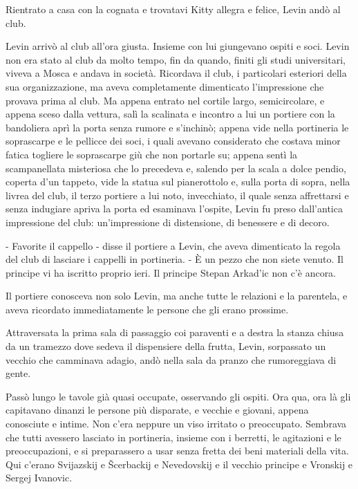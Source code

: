 Rientrato a casa con la cognata e trovatavi Kitty allegra e felice, Levin andò al club. 

\label{vii-6} 

Levin arrivò al club all'ora giusta. Insieme con lui giungevano ospiti e soci. Levin non era stato al club da molto tempo, fin da quando, finiti gli studi universitari, viveva a Mosca e andava in società. Ricordava il club, i particolari esteriori della sua organizzazione, ma aveva completamente dimenticato l'impressione che provava prima al club. Ma appena entrato nel cortile largo, semicircolare, e appena sceso dalla vettura, salì la scalinata e incontro a lui un portiere con la bandoliera aprì la porta senza rumore e s'inchinò; appena vide nella portineria le soprascarpe e le pellicce dei soci, i quali avevano considerato che costava minor fatica togliere le soprascarpe giù che non portarle su; appena sentì la scampanellata misteriosa che lo precedeva e, salendo per la scala a dolce pendio, coperta d'un tappeto, vide la statua sul pianerottolo e, sulla porta di sopra, nella livrea del club, il terzo portiere a lui noto, invecchiato, il quale senza affrettarsi e senza indugiare apriva la porta ed esaminava l'ospite, Levin fu preso dall'antica impressione del club: un'impressione di distensione, di benessere e di decoro. 

- Favorite il cappello - disse il portiere a Levin, che aveva dimenticato la regola del club di lasciare i cappelli in portineria. - È un pezzo che non siete venuto. Il principe vi ha iscritto proprio ieri. Il principe Stepan Arkad'ic non c'è ancora. 

Il portiere conosceva non solo Levin, ma anche tutte le relazioni e la parentela, e aveva ricordato immediatamente le persone che gli erano prossime. 

Attraversata la prima sala di passaggio coi paraventi e a destra la stanza chiusa da un tramezzo dove sedeva il dispensiere della frutta, Levin, sorpassato un vecchio che camminava adagio, andò nella sala da pranzo che rumoreggiava di gente. 

Passò lungo le tavole già quasi occupate, osservando gli ospiti. Ora qua, ora là gli capitavano dinanzi le persone più disparate, e vecchie e giovani, appena conosciute e intime. Non c'era neppure un viso irritato o preoccupato. Sembrava che tutti avessero lasciato in portineria, insieme con i berretti, le agitazioni e le preoccupazioni, e si preparassero a usar senza fretta dei beni materiali della vita. Qui c'erano Svijazskij e Šcerbackij e Nevedovskij e il vecchio principe e Vronskij e Sergej Ivanovic. 

